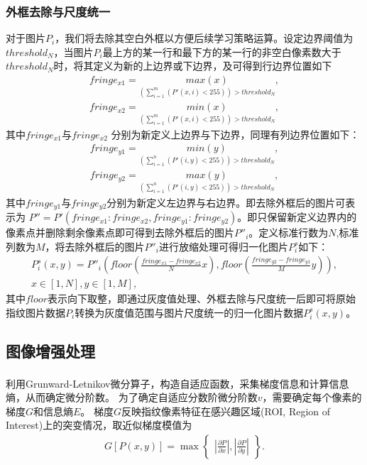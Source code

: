 \documentclass{whutmod}
\newcommand{\upcite}[1]{\textsuperscript{\cite{#1}}}
\begin{document}
\begin{itemize}
\subsubsection{外框去除与尺度统一}
对于图片$P_{i}$，我们将去除其空白外框以方便后续学习策略运算。设定边界阈值为$threshold_N$，当图片$P_{i}$最上方的某一行和最下方的某一行的非空白像素数大于$threshold_N$时，将其定义为新的上边界或下边界，及可得到行边界位置如下
\begin{gather*}
	fringe_{x1}=\underset{ (\sum_{i=1}^{m} (P'(x,i)<255))>threshold_N}{max(x)},\\
	fringe_{x2}=\underset{(\sum_{i=1}^{m} (P'(x,i)<255))>threshold_N}{min(x)},
\end{gather*}
其中$fringe_{x1}$与$fringe_{x2}$ 分别为新定义上边界与下边界，同理有列边界位置如下：
\begin{gather*}
	fringe_{y1}=\underset{(\sum_{i=1}^{n} (P'(i,y)<255))>threshold_N}{min(y)},\\
	fringe_{y2}=\underset{(\sum_{i=1}^{n} (P'(i,y)<255))>threshold_N}{max(y)},
\end{gather*}
其中$fringe_{y1}$与$fringe_{y2}$分别为新定义左边界与右边界。即去除外框后的图片可表示为	$P''=P'(	fringe_{x1}:	fringe_{x2},	fringe_{y1}:	fringe_{y2})$。即只保留新定义边界内的像素点并删除剩余像素点即可得到去除外框后的图片$P''_{i}$。定义标准行数为$N$,标准列数为$M$，将去除外框后的图片$P''_{i}$进行放缩处理可得归一化图片$P_{i}^s$如下：
\begin{gather*}
	P_{i}^s(x,y)=P''_{i}(floor(\frac{fringe_{x1}-fringe_{x2}}{N}x),floor(\frac{fringe_{y2}-fringe_{y1}}{M}y)),\\
	x\in[1,N],	y\in[1,M],
\end{gather*}
其中$floor$表示向下取整，即通过灰度值处理、外框去除与尺度统一后即可将原始指纹图片数据$P_{i}$转换为灰度值范围与图片尺度统一的归一化图片数据$P_{i}^s(x,y)$。
\subsection{图像增强处理}
利用Grunward-Letnikov微分算子\upcite{5}，构造自适应函数，采集梯度信息和计算信息熵，从而确定微分阶数。	
为了确定自适应分数阶微分阶数$v$，需要确定每个像素的梯度$G$和信息熵$E$。
梯度$G$反映指纹像素特征在感兴趣区域(ROI, Region of Interest)上的突变情况，取近似梯度模值为
\begin{gather}
	\displaystyle G[P(x,y)]=\max\begin{Bmatrix}
		|\frac{\partial P }{\partial x}|,|\frac{\partial P}{\partial y}|
	\end{Bmatrix}.
\end{gather}


\end{itemize}
\end{document}
